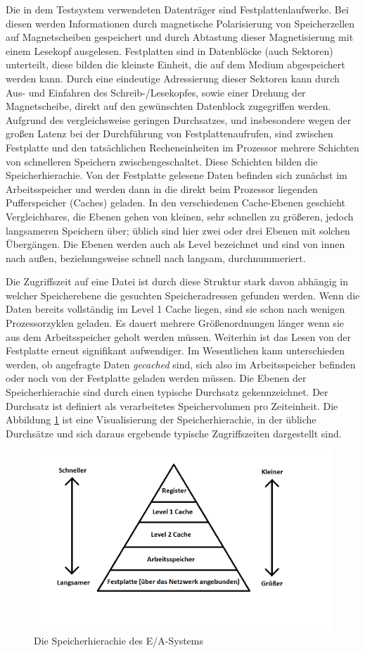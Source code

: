 \documentclass[
	12pt,
	a4paper,
	BCOR10mm,
	DIV14,
	listof=totoc,
	bibliography=totoc,
	headsepline
]{scrreprt}
\begin{document}
Die in dem Testsystem verwendeten Datenträger sind Festplattenlaufwerke. Bei diesen werden Informationen durch magnetische Polarisierung von Speicherzellen auf Magnetscheiben gespeichert und durch Abtastung dieser Magnetisierung mit einem Lesekopf ausgelesen.
Festplatten sind in Datenblöcke (auch Sektoren) unterteilt, diese bilden die kleinste Einheit, die auf dem Medium abgespeichert werden kann. Durch eine eindeutige Adressierung dieser Sektoren kann durch Aus- und Einfahren des Schreib-/Lesekopfes, sowie einer Drehung der Magnetscheibe, direkt auf den gewünschten Datenblock zugegriffen werden.
Aufgrund des vergleichsweise geringen Durchsatzes, und insbesondere wegen der großen Latenz bei der Durchführung von Festplattenaufrufen, sind zwischen Festplatte und den tatsächlichen Recheneinheiten im Prozessor mehrere Schichten von schnelleren Speichern zwischengeschaltet. Diese Schichten bilden die Speicherhierachie.
Von der Festplatte gelesene Daten befinden sich zunächst im Arbeitsspeicher und werden dann in die direkt beim Prozessor liegenden Pufferspeicher (Caches) geladen.
In den verschiedenen Cache-Ebenen geschieht Vergleichbares, die Ebenen gehen von kleinen, sehr schnellen zu größeren, jedoch langsameren Speichern über; üblich sind hier zwei oder drei Ebenen mit solchen Übergängen. Die Ebenen werden auch als Level bezeichnet und sind von innen nach außen, beziehungsweise schnell nach langsam, durchnummeriert. 
\medskip

Die Zugriffszeit auf eine Datei ist durch diese Struktur stark davon abhängig in welcher Speicherebene die gesuchten Speicheradressen gefunden werden. Wenn die Daten bereits vollständig im Level 1 Cache liegen, sind sie schon nach wenigen Prozessorzyklen geladen. Es dauert mehrere Größenordnungen länger wenn sie aus dem Arbeitsspeicher geholt werden müssen. Weiterhin ist das Lesen von der Festplatte erneut signifikant aufwendiger. Im Wesentlichen kann unterschieden werden, ob angefragte Daten \textit{gecached} sind, sich also im Arbeitsspeicher befinden oder noch von der Festplatte geladen werden müssen.
Die Ebenen der Speicherhierachie sind durch einen typische Durchsatz gekennzeichnet. Der Durchsatz ist definiert als verarbeitetes Speichervolumen pro Zeiteinheit. Die Abbildung \ref{fig:mem_hierachie} ist eine Visualisierung der Speicherhierachie, in der übliche Durchsätze und sich daraus ergebende typische Zugriffszeiten dargestellt sind.

\begin{figure}[h]
	\begin{center}
		\includegraphics[height=.35\textwidth]{Bilder/hierachie.png}
	\end{center}
	\caption{Die Speicherhierachie des E/A-Systems}
	\label{fig:mem_hierachie}
\end{figure}
\end{document}
